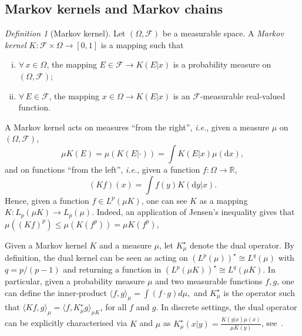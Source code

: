 \documentclass[11pt]{article}
\theoremstyle{plain}
\theoremstyle{remark}
\newtheorem{definition}[theorem]{Definition}
\begin{document}
    \subsection{Markov kernels and Markov chains}\label{sec:markovPreliminaries}
    \begin{definition}[Markov kernel]
    Let $(\Omega,\mathcal{F})$ be a measurable space. A \emph{Markov kernel} $K:\mathcal{F}\times \Omega \to [0,1]$ is a mapping such that \begin{enumerate}[(i)]
        \item $\forall \, x\in \Omega$, the mapping $E\in\mathcal{F}\to K(E|x)$ is a probability measure on $(\Omega,\mathcal{F})$;
        \item $\forall\, E\in\mathcal{F}$, the mapping $x \in \Omega \to K(E|x)$ is an $\mathcal{F}$-measurable real-valued function.    
    \end{enumerate}
    
    \end{definition}
    A Markov kernel acts %
    on measures ``from the right'', \textit{i.e.}, given a measure $\mu$ on $(\Omega, \mathcal{F})$, 
    $$\mu K(E) = \mu(K(E|\cdot)) = \int  K(E|x) \mu(\mathrm{d}x),
    $$
    and on functions ``from the left'',  \textit{i.e.}, given a function $f:\Omega \to \mathbb{R}$,
    $$
        (K f)(x) = \int f(y) K(\mathrm{d}y|x).
    $$
     Hence, given a function $f\in L^p(\mu K)$, one can see $K$ as a mapping $K:L_p(\mu K)\to L_p(\mu)$.
     Indeed, an application of Jensen's inequality gives that
$         \mu((Kf)^p)\leq \mu(K(f^p)) = \mu K(f^p)$,

     Given a Markov kernel $K$ and a measure $\mu$, let %
     $K^\star_\mu$ denote the dual operator. By definition, the dual kernel can be seen as acting on $(L^p(\mu ))^\star \cong L^q(\mu )$ with $q = p/(p-1)$ and returning a function in $(L^p(\mu K))^\star \cong L^q(\mu K)$. In particular, given a probability measure $\mu$ and two measurable functions $f,g$, one can define the inner-product $\langle f,g \rangle_\mu = \int (f\cdot g) d\mu,$
     and $K^\star_\mu$ is %
     the operator such that 
         $\langle Kf, g \rangle_\mu = \langle f, K^\star_\mu g \rangle_{\mu K}$, %
     for all $f$ and $g$. %
     In discrete settings, the dual operator can be explicitly characterised via $K$ and $\mu$ as $           K_\mu^\star(x|y) = \frac{K(y|x)\mu(x)}{\mu K (y)}$, see~\cite[Eq. (1.2)]{sdpiRaginsky}. 
   
\end{document}
